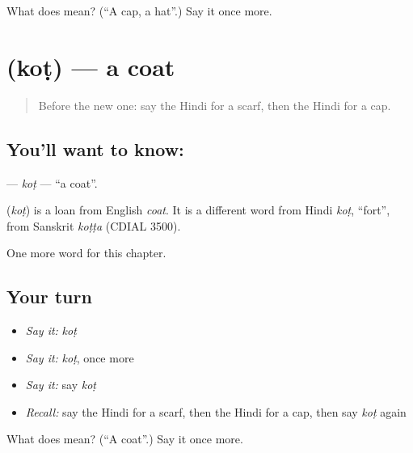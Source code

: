 \begin{tcolorbox}[breakable,colback=teal!4,colframe=teal!35!black,title={Before you move on}]
What does  mean? (\textquotedblleft{}A cap, a hat\textquotedblright{}.) Say it once more.
\end{tcolorbox}
\section[\texorpdfstring{\hi{कोट} (koṭ)}{कोट (koṭ)}]{ (koṭ) — a coat}

\label{lesson:HI-C136-kot}



\begin{quote}
Before the new one: say the Hindi for a scarf, then the Hindi for a cap.
\end{quote}

\subsection*{You'll want to know: }
\textbf{} — \emph{koṭ} — \textquotedblleft{}a coat\textquotedblright{}.

\begin{cousinweb}
\textbf{} (\emph{koṭ}) is a loan from English \emph{coat}. It is a different word from Hindi \emph{koṭ}, \textquotedblleft{}fort\textquotedblright{}, from Sanskrit \emph{koṭṭa} (CDIAL 3500).
\end{cousinweb}

\begin{grammarlens}[title={What you've built}]
One more word for this chapter.
\end{grammarlens}

\subsection*{Your turn}
\begin{itemize}
\raggedright
  \item \emph{Say it:} \emph{koṭ}
  \item \emph{Say it:} \emph{koṭ}, once more
  \item \emph{Say it:} say \emph{koṭ}
  \item \emph{Recall:} say the Hindi for a scarf, then the Hindi for a cap, then say \emph{koṭ} again
\end{itemize}

\begin{tcolorbox}[breakable,colback=teal!4,colframe=teal!35!black,title={Before you move on}]
What does  mean? (\textquotedblleft{}A coat\textquotedblright{}.) Say it once more.
\end{tcolorbox}
